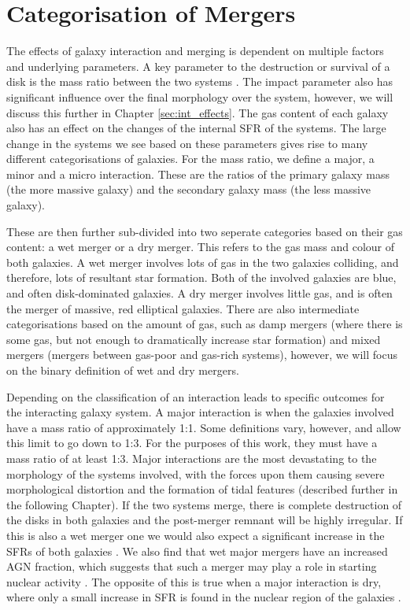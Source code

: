 \section{Categorisation of Mergers}
\noindent The effects of galaxy interaction and merging is dependent on multiple factors and underlying parameters. A key parameter to the destruction or survival of a disk is the mass ratio between the two systems \citep{2005A&A...437...69B, 2008MNRAS.384..386C}. The impact parameter also has significant influence over the final morphology over the system, however, we will discuss this further in Chapter \ref{sec:int_effects}. The gas content of each galaxy also has an effect on the changes of the internal SFR of the systems. The large change in the systems we see based on these parameters gives rise to many different categorisations of galaxies. For the mass ratio, we define a major, a minor and a micro interaction. These are the ratios of the primary galaxy mass (the more massive galaxy) and the secondary galaxy mass (the less massive galaxy). 

These are then further sub-divided into two seperate categories based on their gas content: a wet merger or a dry merger. This refers to the gas mass and colour of both galaxies. A wet merger involves lots of gas in the two galaxies colliding, and therefore, lots of resultant star formation. Both of the involved galaxies are blue, and often disk-dominated galaxies. A dry merger involves little gas, and is often the merger of massive, red elliptical galaxies. There are also intermediate categorisations based on the amount of gas, such as damp mergers (where there is some gas, but not enough to dramatically increase star formation) and mixed mergers (mergers between gas-poor and gas-rich systems), however, we will focus on the binary definition of wet and dry mergers.

Depending on the classification of an interaction leads to specific outcomes for the interacting galaxy system. A major interaction is when the galaxies involved have a mass ratio of approximately 1:1. Some definitions vary, however, and allow this limit to go down to 1:3. For the purposes of this work, they must have a mass ratio of at least 1:3. Major interactions are the most devastating to the morphology of the systems involved, with the forces upon them causing severe morphological distortion and the formation of tidal features (described further in the following Chapter). If the two systems merge, there is complete destruction of the disks in both galaxies and the post-merger remnant will be highly irregular. If this is also a wet merger one we would also expect a significant increase in the SFRs of both galaxies \citep{1994ApJ...425L..13M, 1996ApJ...464..641M, 2006AJ....132..197W}. We also find that wet major mergers have an increased AGN fraction, which suggests that such a merger may play a role in starting nuclear activity \citep{2007MNRAS.375.1017A, 2011MNRAS.418.2043E, 2012ApJ...746L..22K}. The opposite of this is true when a major interaction is dry, where only a small increase in SFR is found in the nuclear region of the galaxies \citep{2004ApJ...614..586S, 2006ApJ...640..241B}.

